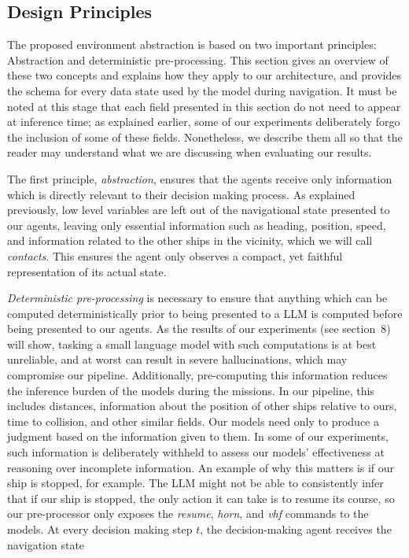 \documentclass[10pt]{reportMaster}
\begin{document}
\subsection{Design Principles}

The proposed environment abstraction is based on two important principles: Abstraction and deterministic pre-processing. This section gives an overview of these two concepts and explains how they apply to our architecture, and provides the schema for every data state used by the model during navigation. It must be noted at this stage that each field presented in this section do not need to appear at inference time; as explained earlier, some of our experiments deliberately forgo the inclusion of some of these fields. Nonetheless, we describe them all so that the reader may understand what we are discussing when evaluating our results. 

The first principle, \textit{abstraction}, ensures that the agents receive only information which is directly relevant to their decision making process. As explained previously, low level variables are left out of the navigational state presented to our agents, leaving only essential information such as heading, position, speed, and information related to the other ships in the vicinity, which we will call \textit{contacts}. This ensures the agent only observes a compact, yet faithful representation of its actual state.

\textit{Deterministic pre-processing} is necessary to ensure that anything which can be computed deterministically prior to being presented to a LLM is computed before being presented to our agents. As the results of our experiments (see section~8) will show, tasking a small language model with such computations is at best unreliable, and at worst can result in severe hallucinations, which may compromise our pipeline. Additionally, pre-computing this information reduces the inference burden of the models during the missions. In our pipeline, this includes distances, information about the position of other ships relative to ours, time to collision, and other similar fields. Our models need only to produce a judgment based on the information given to them. In some of our experiments, such information is deliberately withheld to assess our models' effectiveness at reasoning over incomplete information. An example of why this matters is if our ship is stopped, for example. The LLM might not be able to consistently infer that if our ship is stopped, the only action it can take is to resume its course, so our pre-processor only exposes the \textit{resume}, \textit{horn}, and \textit{vhf} commands to the models. At every decision making step $t$, the decision-making agent receives the navigation state
\end{document}
